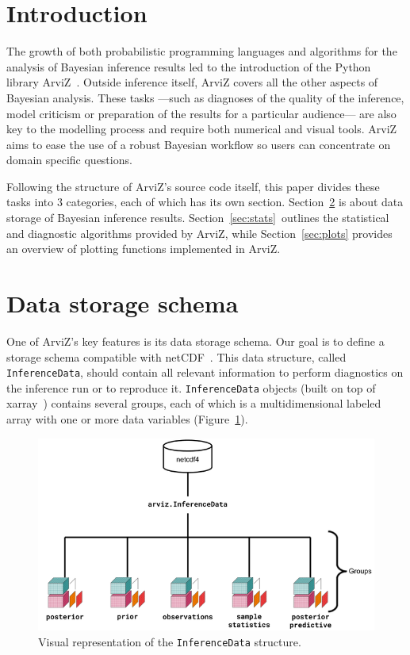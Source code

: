 \documentclass[anonymous=false, %
               format=acmsmall, %
               review=true, %
               screen=true, %
               nonacm=true]{acmart}
\begin{document}
\maketitle

\section{Introduction}
The growth of both probabilistic programming languages and algorithms for the
analysis of Bayesian inference results led to the introduction of the Python
library ArviZ~\cite{arviz2019}. Outside inference itself, ArviZ covers
all the other aspects of Bayesian analysis. These tasks ---such as diagnoses of
the quality of the inference, model criticism or preparation of the results
for a particular audience--- are also key to the modelling process and
require both numerical and visual tools. ArviZ aims to
ease the use of a robust
Bayesian workflow so users can concentrate on domain
specific questions.

Following the structure of ArviZ's source code itself, this
paper divides these tasks into 3 categories, each of which has its own
section. Section~\ref{sec:data} is about data storage of Bayesian inference
results.
Section~\ref{sec:stats}~outlines the statistical and diagnostic algorithms
provided by ArviZ, while Section~\ref{sec:plots} provides an overview of
plotting functions implemented in ArviZ.

\section{Data storage schema}\label{sec:data}
One of ArviZ's key features is its data storage schema. Our goal is to define
a storage schema compatible
with netCDF~\cite{unidata2011network}. This data structure, called
\texttt{InferenceData}, should contain all
relevant information to perform diagnostics on the inference run or to reproduce
it.
\texttt{InferenceData} objects (built on
top of xarray~\cite{hoyer2017xarray}) contains several groups, each of which is
a multidimensional labeled array with one or more data variables
(Figure~\ref{fig:data}).

\begin{figure}[!hbt]
  \centering
  \includegraphics[width=0.6\linewidth]{InferenceDataStructure.png}
  \caption{Visual representation of the \texttt{InferenceData}
  structure.}\label{fig:data}
\end{figure}
\end{document}
